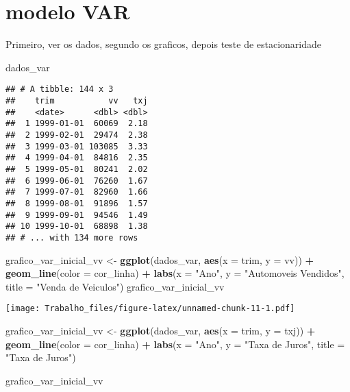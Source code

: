 \documentclass[
]{article}
\newenvironment{Shaded}{\begin{snugshade}}{\end{snugshade}}
\newcommand{\AttributeTok}[1]{\textcolor[rgb]{0.13,0.29,0.53}{#1}}
\newcommand{\FunctionTok}[1]{\textcolor[rgb]{0.13,0.29,0.53}{\textbf{#1}}}
\newcommand{\NormalTok}[1]{#1}
\newcommand{\OtherTok}[1]{\textcolor[rgb]{0.56,0.35,0.01}{#1}}
\newcommand{\SpecialCharTok}[1]{\textcolor[rgb]{0.81,0.36,0.00}{\textbf{#1}}}
\newcommand{\StringTok}[1]{\textcolor[rgb]{0.31,0.60,0.02}{#1}}
\begin{document}
\hypertarget{modelo-var}{%
\section{modelo VAR}\label{modelo-var}}

Primeiro, ver os dados, segundo os graficos, depois teste de
estacionaridade

\begin{Shaded}
\begin{Highlighting}[]
\NormalTok{dados\_var}
\end{Highlighting}
\end{Shaded}

\begin{verbatim}
## # A tibble: 144 x 3
##    trim           vv   txj
##    <date>      <dbl> <dbl>
##  1 1999-01-01  60069  2.18
##  2 1999-02-01  29474  2.38
##  3 1999-03-01 103085  3.33
##  4 1999-04-01  84816  2.35
##  5 1999-05-01  80241  2.02
##  6 1999-06-01  76260  1.67
##  7 1999-07-01  82960  1.66
##  8 1999-08-01  91896  1.57
##  9 1999-09-01  94546  1.49
## 10 1999-10-01  68898  1.38
## # ... with 134 more rows
\end{verbatim}

\begin{Shaded}
\begin{Highlighting}[]
\NormalTok{grafico\_var\_inicial\_vv }\OtherTok{\textless{}{-}} \FunctionTok{ggplot}\NormalTok{(dados\_var, }\FunctionTok{aes}\NormalTok{(}\AttributeTok{x =}\NormalTok{ trim, }\AttributeTok{y =}\NormalTok{ vv)) }\SpecialCharTok{+}
  \FunctionTok{geom\_line}\NormalTok{(}\AttributeTok{color =}\NormalTok{ cor\_linha) }\SpecialCharTok{+}
  \FunctionTok{labs}\NormalTok{(}\AttributeTok{x =} \StringTok{"Ano"}\NormalTok{, }\AttributeTok{y =} \StringTok{"Automoveis Vendidos"}\NormalTok{, }\AttributeTok{title =} \StringTok{"Venda de Veiculos"}\NormalTok{)}
\NormalTok{grafico\_var\_inicial\_vv}
\end{Highlighting}
\end{Shaded}

\texttt{[image: Trabalho\_files/figure-latex/unnamed-chunk-11-1.pdf]}

\begin{Shaded}
\begin{Highlighting}[]
\NormalTok{grafico\_var\_inicial\_vv }\OtherTok{\textless{}{-}} \FunctionTok{ggplot}\NormalTok{(dados\_var, }\FunctionTok{aes}\NormalTok{(}\AttributeTok{x =}\NormalTok{ trim, }\AttributeTok{y =}\NormalTok{ txj)) }\SpecialCharTok{+}
  \FunctionTok{geom\_line}\NormalTok{(}\AttributeTok{color =}\NormalTok{ cor\_linha) }\SpecialCharTok{+}
  \FunctionTok{labs}\NormalTok{(}\AttributeTok{x =} \StringTok{"Ano"}\NormalTok{, }\AttributeTok{y =} \StringTok{"Taxa de Juros"}\NormalTok{, }\AttributeTok{title =} \StringTok{"Taxa de Juros"}\NormalTok{)}

\NormalTok{grafico\_var\_inicial\_vv}
\end{Highlighting}
\end{Shaded}
\end{document}

